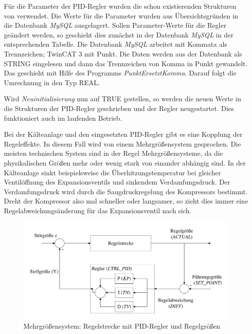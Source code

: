 Für die Parameter der PID-Regler wurden die schon existierenden Strukturen von \textsc{\citeauthor{Nuerenberg2015}} verwendet. Die Werte für die Parameter wurden aus Übersichtsgründen in die Datenbank \textit{MySQL} ausgelagert. Sollen Parameter-Werte für die Regler geändert werden, so geschieht dies zunächst in der Datenbank  \textit{MySQL} in der entsprechenden Tabelle. Die Datenbank \textit{MySQL} arbeitet mit Kommata als Trennzeichen; TwinCAT 3 mit Punkt. Die Daten werden aus der Datenbank als STRING eingelesen und dann das Trennzeichen von Komma in Punkt gewandelt. Das geschieht mit Hilfe des Programms \textit{PunktErsetztKomma}. Darauf folgt die Umrechnung in den Typ REAL. 

Wird \textit{Neuinitialisierung} nun auf TRUE gestellen, so werden die neuen Werte in die Strukturen der PID-Regler geschrieben und der Regler neugestartet. Dies funktioniert auch im laufenden Betrieb. 

Bei der Kälteanlage und den eingesetzten PID-Regler gibt es eine Kopplung der Regeleffekte. In diesem Fall wird von einem Mehrgrößensystem gesprochen. Die meisten technischen System sind in der Regel Mehrgrößensysteme, da die physikalischen Größen mehr oder wenig stark von einander abhängig sind. In der Kälteanlage  sinkt beispielsweise die Überhitzungstemperatur bei gleicher Ventilöffnung des Expansionsventils und sinkendem Verdamfungsdruck. Der Verdamfungsdruck wird durch die Saugdruckregelung des Kompressors bestimmt. Dreht der Kompressor also mal schneller oder langsamer, so zieht dies immer eine Regelabweichungsänderung für das Expansionsventil nach sich.

\begin{figure}[htb]
\centering		\includegraphics[page=2, width=1.0\textwidth]{Pictures/Versuchsaufbau/PID-Regler.pdf}
\caption{Mehrgrößensystem: Regelstrecke mit PID-Regler und Regelgrößen}
\label{fig:AllePIDs}
\end{figure}


